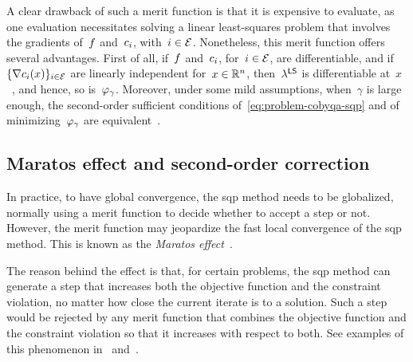 A clear drawback of such a merit function is that it is expensive to evaluate, as one evaluation necessitates solving a linear least-squares problem that involves the gradients of~$f$ and~$c_{i}$, with~$i \in \mathcal{E}$.
Nonetheless, this merit function offers several advantages.
First of all, if~$f$ and~$c_{i}$, for~$i \in \mathcal{E}$, are differentiable, and if~$\set{\nabla \con{i}(\iter)}_{i \in \ieq}$ are linearly independent for~$\iter \in \R^n$, then~$\lm[\mathsf{LS}]$ is differentiable at~$x$~\cite[Lem.~14.2.1]{Conn_Gould_Toint_2000}, and hence, so is~$\merit_{\gamma}$.
Moreover, under some mild assumptions, when~$\gamma$ is large enough, the second-order sufficient conditions of~\cref{eq:problem-cobyqa-sqp} and of minimizing~$\merit_{\gamma}$ are equivalent~\cite[Thm.~14.6.1]{Conn_Gould_Toint_2000}.

\subsection{Maratos effect and second-order correction}

In practice, to have global convergence, the \gls{sqp} method needs to be globalized, normally using a merit function to decide whether to accept a step or not.
However, the merit function may jeopardize the fast local convergence of the \gls{sqp} method.
This is known as the \emph{Maratos effect}~\cite{Maratos_1978}.

The reason behind the effect is that, for certain problems, the \gls{sqp} method can generate a step that increases both the objective function and the constraint violation, no matter how close the current iterate is to a solution.
Such a step would be rejected by any merit function that combines the objective function and the constraint violation so that it increases with respect to both.
See examples of this phenomenon in~\cite[\S~3.5]{Maratos_1978} and~\cite{Powell_1987}.

